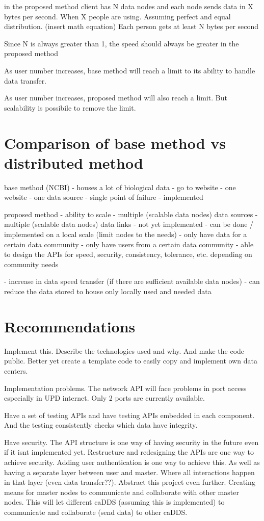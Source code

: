 \documentclass[acmsmall]{acmart}
\begin{document}
in the proposed method
client has N data nodes and each node sends data in X bytes per second. When X people are using. Assuming perfect and equal distribution. 
(insert math equation)
Each person gets  at least N bytes per second

Since N is always greater than 1, the speed should always be greater in the proposed method

As user number increases, base method will reach a limit to its ability to handle data transfer.

As user number increases, proposed method will also reach a limit. But scalability is possibile to remove the limit.


\section{Comparison of base method vs distributed method}

base method (NCBI)
- houses a lot of biological data
- go to website
- one website
- one data source
- single point of failure
- implemented

proposed method
- ability to scale
- multiple (scalable data nodes) data sources
- multiple (scalable data nodes) data links
- not yet implemented
- can be done / implemented on a local scale (limit nodes to the needs)
- only have data for a certain data community
- only have users from a certain data community
- able to design the APIs for speed, security, consistency, tolerance, etc. depending on community needs

- increase in data speed transfer (if there are sufficient available data nodes)
- can reduce the data stored to house only locally used and needed data

\section{Recommendations}

Implement this. Describe the technologies used and why. And make the code public. Better yet create a template code to easily copy and implement own data centers.

Implementation problems. The network API will face problems in port access especially in UPD internet. Only 2 ports are currently available. 

Have a set of testing APIs and have testing APIs embedded in each component. And the testing consistently checks which data have integrity. 

Have security. The API structure is one way of having security in the future even if it isnt implemented yet. Restructure and redesigning the APIs are one way to achieve security. Adding user authentication is one way to achieve this. As well as having a separate layer between user and master. Where all interactions happen in that layer (even data transfer??). 
Abstract this project even further. Creating means for master nodes to communicate and collaborate with other master nodes. This will let different caDDS (assuming this is implemented) to communicate and collaborate (send data) to other caDDS.
\end{document}
